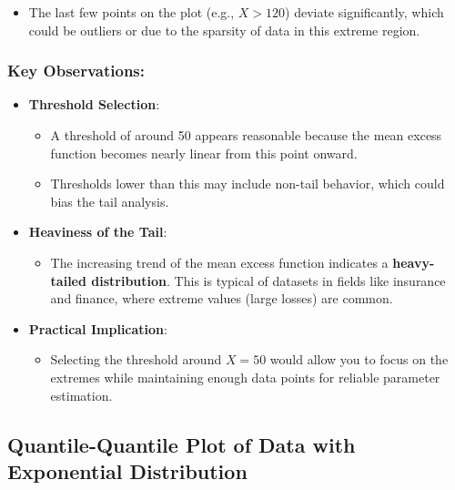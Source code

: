 \documentclass[
  12pt,
]{article}
\providecommand{\tightlist}{%
  \setlength{\itemsep}{0pt}\setlength{\parskip}{0pt}}
\begin{document}
\begin{enumerate}
  \begin{itemize}
  \tightlist
  \item
    The last few points on the plot (e.g., \(X > 120\)) deviate
    significantly, which could be outliers or due to the sparsity of
    data in this extreme region.
  \end{itemize}
\end{enumerate}

\subsubsection{Key Observations:}\label{key-observations}

\begin{itemize}
\tightlist
\item
  \textbf{Threshold Selection}:

  \begin{itemize}
  \tightlist
  \item
    A threshold of around 50 appears reasonable because the mean excess
    function becomes nearly linear from this point onward.
  \item
    Thresholds lower than this may include non-tail behavior, which
    could bias the tail analysis.
  \end{itemize}
\item
  \textbf{Heaviness of the Tail}:

  \begin{itemize}
  \tightlist
  \item
    The increasing trend of the mean excess function indicates a
    \textbf{heavy-tailed distribution}. This is typical of datasets in
    fields like insurance and finance, where extreme values (large
    losses) are common.
  \end{itemize}
\item
  \textbf{Practical Implication}:

  \begin{itemize}
  \tightlist
  \item
    Selecting the threshold around \(X = 50\) would allow you to focus
    on the extremes while maintaining enough data points for reliable
    parameter estimation.
  \end{itemize}
\end{itemize}

\subsection{Quantile-Quantile Plot of Data with Exponential
Distribution}\label{quantile-quantile-plot-of-data-with-exponential-distribution}
\end{document}
